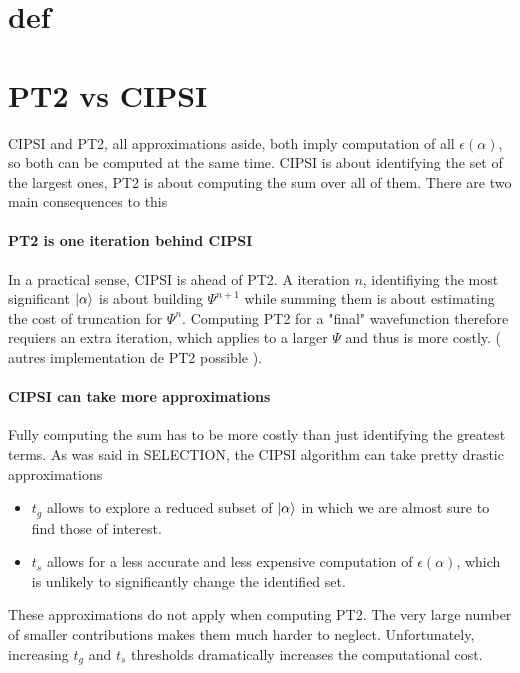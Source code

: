 \documentclass[./thesis.tex]{subfiles}
\begin{document}
\section{def}

\section{PT2 vs CIPSI}

CIPSI and PT2, all approximations aside, both imply computation of all $\epsilon(\alpha)$, so both can be computed at the same time. CIPSI is about identifying the set of the largest ones, PT2 is about computing the sum over all of them. There are two main consequences to this
\paragraph{PT2 is one iteration behind CIPSI}
In a practical sense, CIPSI is ahead of PT2. A iteration $n$, identifiying the most significant $\ket \alpha$ is about building $\Psi^{n+1}$ while summing them is about estimating the cost of truncation for $\Psi^{n}$. Computing PT2 for a "final" wavefunction therefore requiers an extra iteration, which applies to a larger $\Psi$ and thus is more costly. ( autres implementation de PT2 possible ).

\paragraph{CIPSI can take more approximations}
Fully computing the sum has to be more costly than just identifying the greatest terms. As was said in SELECTION, the CIPSI algorithm can take pretty drastic approximations%
	\begin{itemize}
		\item{$t_g$}
		allows to explore a reduced subset of $\ket \alpha$ in which we are almost sure to find those of interest.
		\item{$t_s$}
		allows for a less accurate and less expensive computation of $\epsilon(\alpha)$, which is unlikely to significantly change the identified set.
	\end{itemize}
	These approximations do not apply when computing PT2. The very large number of smaller contributions makes them much harder to neglect. Unfortunately, increasing $t_g$ and $t_s$ thresholds dramatically increases the computational cost.
\end{document}
